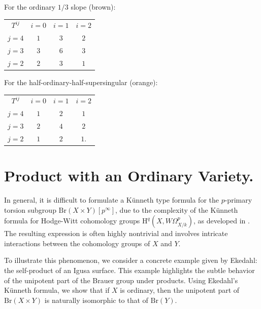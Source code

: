 \documentclass[a4paper,12pt,twoside]{report}
\newcommand{\Br}{\mathrm{Br}}
\newcommand{\HH}{\mathrm{H}}
\begin{document}
For the ordinary $1/3$ slope (brown): 

\begin{center}
    \begin{tabular}{ c|c|c|c } 
     $T^{ij}$             &   $i=0$  & $i=1$  & $i=2$   \\ 
     $j=4$                &    $1$   &   $3$  &  $2$    \\ 
     $j=3$                &    $3$   &   $6$  &  $3$    \\           
     $j=2$                &    $2$   &   $3$  &  $1$    \\          
    \end{tabular}
\end{center}


For the half-ordinary-half-supersingular (orange): 

\begin{center}
    \begin{tabular}{ c|c|c|c } 
     $T^{ij}$             &   $i=0$  & $i=1$  & $i=2$   \\ 
     $j=4$                &    $1$   &   $2$  &  $1$    \\ 
     $j=3$                &    $2$   &   $4$  &  $2$    \\           
     $j=2$                &    $1$   &   $2$  &  $1.$    \\          
    \end{tabular}
\end{center}


\section{Product with an Ordinary Variety.}


In general, it is difficult to formulate a K\"unneth type formula for the $p$-primary torsion subgroup $\Br(X\times Y)[p^\infty]$, 
due to the complexity of the Künneth formula for Hodge-Witt cohomology groups $\HH^q(X,W\Omega^p_{X/k})$, as developed in \cite{Ek2}. 
The resulting expression is often highly nontrivial and involves intricate interactions between the cohomology groups of $X$ and $Y$. 

To illustrate this phenomenon, we consider a concrete example given by Ekedahl: the self-product of an Igusa surface. 
This example highlights the subtle behavior of the unipotent part of the Brauer group under products. 
Using Ekedahl's Künneth formula, we show that if $X$ is ordinary, then the unipotent part of $\Br(X \times Y)$ is naturally isomorphic to that of $\Br(Y)$. 
\end{document}
